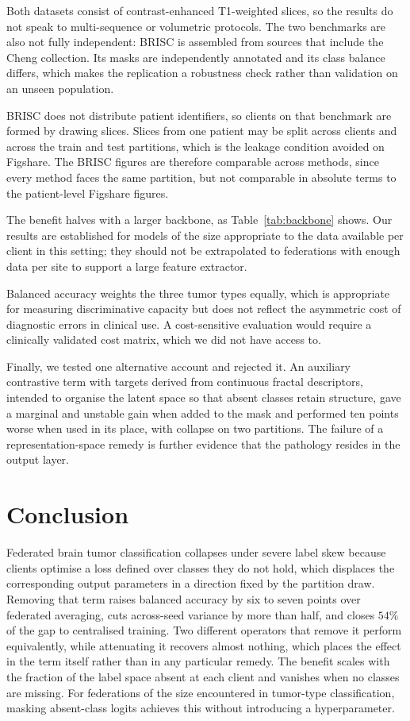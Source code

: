\documentclass[journal]{IEEEtran}
\begin{document}
Both datasets consist of contrast-enhanced T1-weighted slices, so the results do
not speak to multi-sequence or volumetric protocols. The two benchmarks are also
not fully independent: BRISC is assembled from sources that include the Cheng
collection. Its masks are independently annotated and its class balance differs,
which makes the replication a robustness check rather than validation on an
unseen population.

BRISC does not distribute patient identifiers, so clients on that benchmark are
formed by drawing slices. Slices from one patient may be split across clients and
across the train and test partitions, which is the leakage condition avoided on
Figshare. The BRISC figures are therefore comparable across methods, since every
method faces the same partition, but not comparable in absolute terms to the
patient-level Figshare figures.

The benefit halves with a larger backbone, as Table~\ref{tab:backbone} shows. Our
results are established for models of the size appropriate to the data available
per client in this setting; they should not be extrapolated to federations with
enough data per site to support a large feature extractor.

Balanced accuracy weights the three tumor types equally, which is appropriate for
measuring discriminative capacity but does not reflect the asymmetric cost of
diagnostic errors in clinical use. A cost-sensitive evaluation would require a
clinically validated cost matrix, which we did not have access to.

Finally, we tested one alternative account and rejected it. An auxiliary
contrastive term with targets derived from continuous fractal descriptors,
intended to organise the latent space so that absent classes retain structure,
gave a marginal and unstable gain when added to the mask and performed ten points
worse when used in its place, with collapse on two partitions. The failure of a
representation-space remedy is further evidence that the pathology resides in the
output layer.

\section{Conclusion}

Federated brain tumor classification collapses under severe label skew because
clients optimise a loss defined over classes they do not hold, which displaces
the corresponding output parameters in a direction fixed by the partition draw.
Removing that term raises balanced accuracy by six to seven points over
federated averaging, cuts across-seed variance by more than half, and closes
$54\%$ of the gap to centralised training. Two different operators that remove
it perform equivalently, while attenuating it recovers almost nothing, which
places the effect in the term itself rather than in any particular remedy. The
benefit scales with the fraction of the label space absent at each client and
vanishes when no classes are missing. For federations of the size encountered in
tumor-type classification, masking absent-class logits achieves this without
introducing a hyperparameter.
\end{document}
